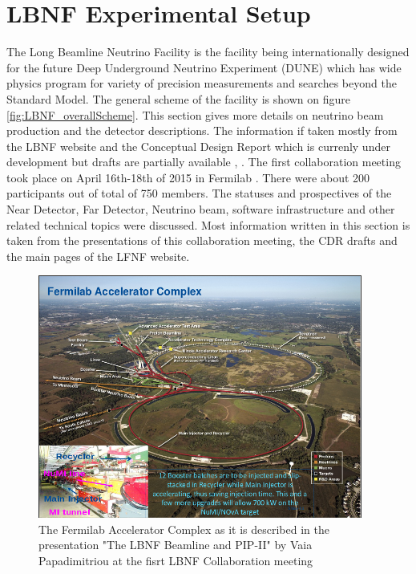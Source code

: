 
\section{LBNF Experimental Setup}

The Long Beamline Neutrino Facility is the facility being internationally designed for the future Deep Underground Neutrino Experiment (DUNE) which has wide physics program for variety of precision measurements and searches beyond the Standard Model. The general scheme of the facility is shown on figure \ref{fig:LBNF_overallScheme}. This section gives more details on neutrino beam production and the detector descriptions. The information if taken mostly from the LBNF website \cite{ref_LBNFweb} and the Conceptual Design Report which is currenly under development but drafts are partially available \cite{ref_LBNFdoc_volume-detectors}, \cite{ref_LBNFdoc_volume-physics}.
The first collaboration meeting took place on April 16th-18th of 2015 in Fermilab \cite{ref_LBNF_collaborationMeeting}. There were about 200 participants out of total of 750 members. The statuses and prospectives of the Near Detector, Far Detector, Neutrino beam, software infrastructure and other related technical topics were discussed. Most information written in this section is taken from the presentations of this collaboration meeting, the CDR drafts and the main pages of the LFNF website.

\begin{figure}
\caption{The Fermilab Accelerator Complex as it is described in the presentation "The LBNF Beamline and PIP-II" by Vaia Papadimitriou at the fisrt LBNF Collaboration meeting \cite{ref_LBNF_collaborationMeeting}}
\label{fig:LBNF_FermilabAccComplex}
\centering
\includegraphics[width=0.95\textwidth, keepaspectratio=true]{figs/FermilabAccelerator.png}

\end{figure}

